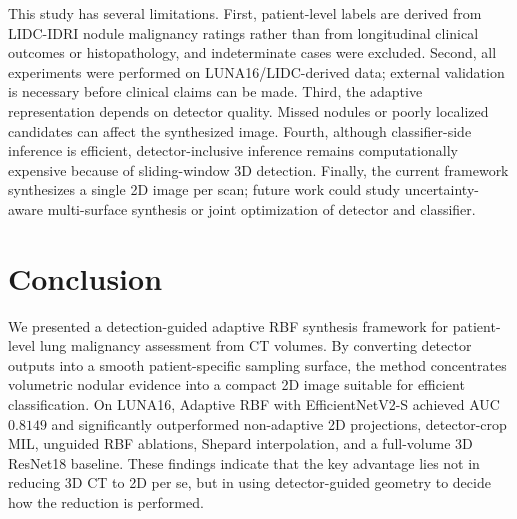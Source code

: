 \documentclass[preprint,12pt]{elsarticle}
\begin{document}
This study has several limitations. First, patient-level labels are derived from LIDC-IDRI nodule malignancy ratings rather than from longitudinal clinical outcomes or histopathology, and indeterminate cases were excluded. Second, all experiments were performed on LUNA16/LIDC-derived data; external validation is necessary before clinical claims can be made. Third, the adaptive representation depends on detector quality. Missed nodules or poorly localized candidates can affect the synthesized image. Fourth, although classifier-side inference is efficient, detector-inclusive inference remains computationally expensive because of sliding-window 3D detection. Finally, the current framework synthesizes a single 2D image per scan; future work could study uncertainty-aware multi-surface synthesis or joint optimization of detector and classifier.

\section{Conclusion}

We presented a detection-guided adaptive RBF synthesis framework for patient-level lung malignancy assessment from CT volumes. By converting detector outputs into a smooth patient-specific sampling surface, the method concentrates volumetric nodular evidence into a compact 2D image suitable for efficient classification. On LUNA16, Adaptive RBF with EfficientNetV2-S achieved AUC $0.8149$ and significantly outperformed non-adaptive 2D projections, detector-crop MIL, unguided RBF ablations, Shepard interpolation, and a full-volume 3D ResNet18 baseline. These findings indicate that the key advantage lies not in reducing 3D CT to 2D per se, but in using detector-guided geometry to decide how the reduction is performed.
\end{document}
